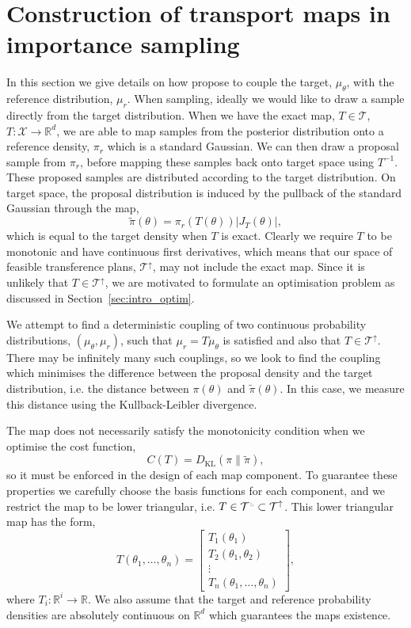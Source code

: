 \documentclass[final]{siamltex}
\newcommand{\ltri}{%
\,\resizebox{!}{0.25\baselineskip}{%
\begin{tikzpicture}%
\draw[line width=1mm](0,0) -- (0,2) -- (2,0)  -- (0,0);
\end{tikzpicture}%
}\xspace%
}%
\begin{document}
\section{Construction of transport maps in importance sampling} \label{sec:map}

In this section we give details on how \cite{parno2014transport} propose to couple the target,
$\mu_{\theta}$, with the reference distribution, $\mu_r$. When sampling, ideally we would like to draw a sample directly from the target distribution. When we have the exact map, $T\in\mathcal{T}$, $T\colon \mathcal{X}\rightarrow\mathbb{R}^d$, we are able to map samples from the posterior distribution onto a reference density, $\pi_r$ which is a standard Gaussian. We can then draw a proposal sample from $\pi_r$, before mapping these samples back onto target space using $T^{-1}$. These proposed samples are distributed according to the target distribution. On target space, the proposal distribution is induced by the pullback of the standard Gaussian through the map,
\begin{equation}\label{eq:pullback}
	\tilde{\pi}(\theta) = \pi_r(T(\theta))|J_T(\theta)|,
\end{equation}
which is equal to the target density when $T$ is exact. Clearly we require $T$ to be monotonic and have continuous first derivatives, which means that our space of feasible transference plans, $\mathcal{T}^\uparrow$, may not include the exact map. Since it is unlikely that $T\in\mathcal{T}^\uparrow$, we are motivated to formulate an optimisation problem as discussed in Section~\ref{sec:intro_optim}.

We attempt to find a deterministic coupling of two continuous probability distributions, $(\mu_\theta, \mu_r)$, such that $\mu_r = T\mu_\theta$ is satisfied and also that $T \in \mathcal{T}^\uparrow$. There may be infinitely many such couplings, so we look to find the coupling which minimises the difference between the proposal density and the target distribution, i.e. the distance between $\pi(\theta)$ and $\tilde{\pi}(\theta)$. In this case, we measure this distance using the Kullback-Leibler divergence.

The map does not necessarily satisfy the monotonicity condition when we optimise the cost function,
\[
	C(T) = D_\text{KL}(\pi\|\tilde{\pi}),
\]
so it must be enforced in the design of each map component. To guarantee these properties we carefully choose the basis functions for each component, and we restrict the map to be lower triangular, i.e. $T \in \mathcal{T}^{\ltri}\subset\mathcal{T}^\uparrow$. This lower triangular map has the form,
\[
	T(\theta_1, \dots, \theta_n) = \begin{bmatrix} T_1(\theta_1) \\ T_2(\theta_1, \theta_2) \\ \vdots \\
		T_n(\theta_1, \dots, \theta_n) \end{bmatrix},
\]
where $T_i\colon \mathbb{R}^i \to \mathbb{R}$. We also assume that the target and reference probability densities are absolutely continuous on
$\mathbb{R}^d$ which guarantees the maps existence.
\end{document}
